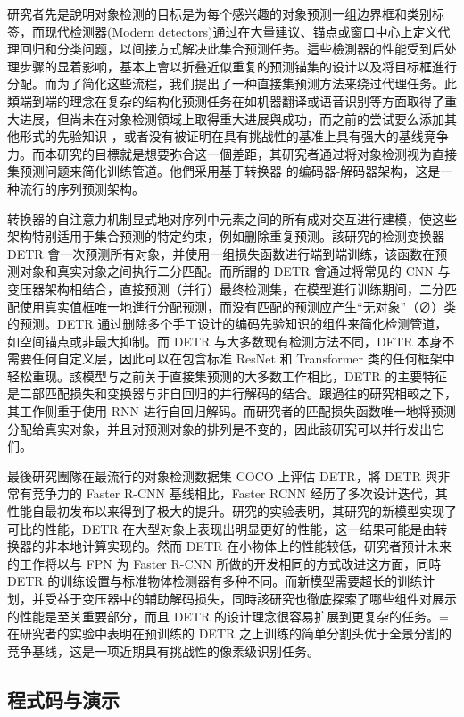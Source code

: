 研究者先是說明对象检测的目标是为每个感兴趣的对象预测一组边界框和类别标签，而现代检测器(Modern detectors)通过在大量建议、锚点或窗口中心上定义代理回归和分类问题，以间接方式解决此集合预测任务。這些檢測器的性能受到后处理步骤的显着影响，基本上會以折叠近似重复的预测锚集的设计以及将目标框進行分配。而为了简化这些流程，我们提出了一种直接集预测方法来绕过代理任务。此類端到端的理念在复杂的结构化预测任务在如机器翻译或语音识别等方面取得了重大进展，但尚未在对象检测領域上取得重大进展與成功，而之前的尝试要么添加其他形式的先验知识 ，或者没有被证明在具有挑战性的基准上具有强大的基线竞争力。而本研究的目標就是想要弥合这一個差距，其研究者通过将对象检测视为直接集预测问题来简化训练管道。他們采用基于转换器 的编码器-解码器架构，这是一种流行的序列预测架构。

转换器的自注意力机制显式地对序列中元素之间的所有成对交互进行建模，使这些架构特别适用于集合预测的特定约束，例如删除重复预测。該研究的检测变换器 DETR  會一次预测所有对象，并使用一组损失函数进行端到端训练，该函数在预测对象和真实对象之间执行二分匹配。而所謂的 DETR 會通过将常见的 CNN 与变压器架构相结合，直接预测（并行）最终检测集，在模型進行训练期间，二分匹配使用真实值框唯一地進行分配预测，而没有匹配的预测应产生“无对象”（∅）类的预测。DETR 通过删除多个手工设计的编码先验知识的组件来简化检测管道，如空间锚点或非最大抑制。而 DETR 与大多数现有检测方法不同，DETR 本身不需要任何自定义层，因此可以在包含标准 ResNet 和 Transformer 类的任何框架中轻松重现。該模型与之前关于直接集预测的大多数工作相比，DETR 的主要特征是二部匹配损失和变换器与非自回归的并行解码的结合。跟過往的研究相較之下，其工作侧重于使用 RNN 进行自回归解码。而研究者的匹配损失函数唯一地将预测分配给真实对象，并且对预测对象的排列是不变的，因此該研究可以并行发出它们。

最後研究團隊在最流行的对象检测数据集 COCO 上评估 DETR，將 DETR 與非常有竞争力的 Faster R-CNN 基线相比，Faster RCNN 经历了多次设计迭代，其性能自最初发布以来得到了极大的提升。研究的实验表明，其研究的新模型实现了可比的性能，DETR 在大型对象上表现出明显更好的性能，这一结果可能是由转换器的非本地计算实现的。然而 DETR 在小物体上的性能较低，研究者预计未来的工作将以与 FPN 为 Faster R-CNN 所做的开发相同的方式改进这方面，同時 DETR 的训练设置与标准物体检测器有多种不同。而新模型需要超长的训练计划，并受益于变压器中的辅助解码损失，同時該研究也徹底探索了哪些组件对展示的性能是至关重要部分，而且 DETR 的设计理念很容易扩展到更复杂的任务。=在研究者的实验中表明在预训练的 DETR 之上训练的简单分割头优于全景分割的竞争基线，这是一项近期具有挑战性的像素级识别任务。

\subsection{程式码与演示}

